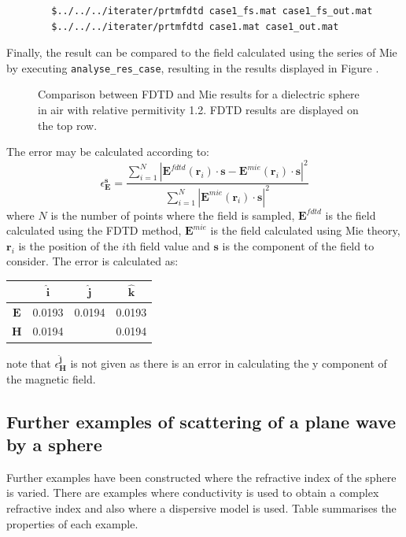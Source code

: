 \documentclass[a4paper, 12pt]{article}
\begin{document}
	\begin{verbatim}
		$../../../iterater/prtmfdtd case1_fs.mat case1_fs_out.mat
		$../../../iterater/prtmfdtd case1.mat case1_out.mat
	\end{verbatim}

	Finally, the result can be compared to the field calculated using the
	series of Mie by executing \verb+analyse_res_case+, resulting in the
	results displayed in Figure .

	\begin{figure}[!h]
		\begin{center}
			\caption{Comparison between FDTD and Mie results for a dielectric
				sphere in air with relative permitivity 1.2. FDTD results are
				displayed on the top row.}
		\end{center}
	\end{figure}
	The error may be calculated according to:
	\begin{equation} \label{e:Global-Error-Metric-copy}
		\epsilon_\mathbf{E}^\mathbf{s}=\frac{\sum_{i=1}^{N}|{\mathbf{E}^{fdtd}(\mathbf{r}_{i})\cdot\mathbf{s}-\mathbf{E}^{mie}(\mathbf{r}_{i})\cdot\mathbf{s}}|^{2}}%
		{\sum_{i=1}^{N}|\mathbf{E}^{mie}(\mathbf{r}_{i})\cdot\mathbf{s}|^{2}}
	\end{equation}
	where $N$ is the number of points where the field is
	sampled, $\mathbf{E}^{fdtd}$ is the field calculated using the FDTD method, $\mathbf{E}^{mie}$ is the field
	calculated using Mie theory, $\mathbf{r}_i$ is the position of the
	$i$th field value and $\mathbf{s}$ is the component of the field to
	consider. The error is calculated as:
	\newline
	\begin{table}[hbp]
		\begin{tabular}{|c|c|c|c|}
			\hline
			&$\mathbf{\hat{i}}$&$\mathbf{\hat{j}}$&$\mathbf{\hat{k}}$\\
			\hline
			$\mathbf{E}$&0.0193&    0.0194&    0.0193\\
			$\mathbf{H}$&0.0194&    &    0.0194\\
			\hline
		\end{tabular}
	\end{table}
	note that $\epsilon_\mathbf{H}^\mathbf{\hat{j}}$ is not given as there
	is an error in calculating the y component of the magnetic field.
	\subsection{Further examples of scattering of a plane wave by a
		sphere}
	Further examples have been constructed where the refractive index of
	the sphere is varied. There are examples where conductivity is used to
	obtain a complex refractive index and also where a dispersive model is
	used. Table summarises the properties of each example.
\end{document}
